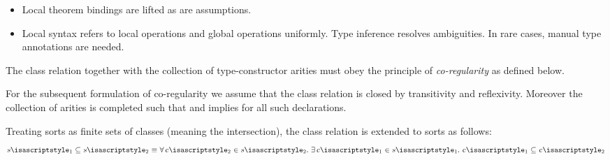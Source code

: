 \begin{isabellebody}
\begin{isamarkuptext}
\begin{itemize}
  \item Local theorem bindings are lifted as are assumptions.

  \item Local syntax refers to local operations  and
  global operations  uniformly.  Type inference
  resolves ambiguities.  In rare cases, manual type annotations are
  needed.
  
  \end{itemize}%
\end{isamarkuptext}%
\isamarkuptrue%
%
\isamarkuptrue%
%
\begin{isamarkuptext}%
The class relation together with the collection of
  type-constructor arities must obey the principle of
  \emph{co-regularity} as defined below.

  \medskip For the subsequent formulation of co-regularity we assume
  that the class relation is closed by transitivity and reflexivity.
  Moreover the collection of arities  is
  completed such that  and 
  implies  for all such declarations.

  Treating sorts as finite sets of classes (meaning the intersection),
  the class relation  is extended to sorts as
  follows:
  \[
    \isa{{\isachardoublequote}s\isactrlsub {\isadigit{1}}\ {\isasymsubseteq}\ s\isactrlsub {\isadigit{2}}\ {\isasymequiv}\ {\isasymforall}c\isactrlsub {\isadigit{2}}\ {\isasymin}\ s\isactrlsub {\isadigit{2}}{\isachardot}\ {\isasymexists}c\isactrlsub {\isadigit{1}}\ {\isasymin}\ s\isactrlsub {\isadigit{1}}{\isachardot}\ c\isactrlsub {\isadigit{1}}\ {\isasymsubseteq}\ c\isactrlsub {\isadigit{2}}{\isachardoublequote}}
  \]


\end{isamarkuptext}
\end{isabellebody}
